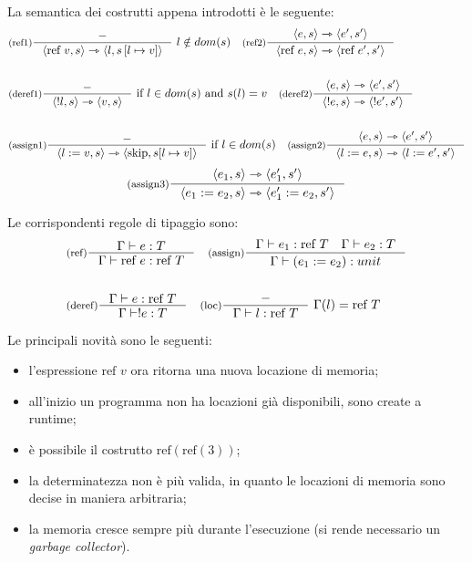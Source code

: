 \documentclass[a4paper, 11pt]{article}
\newcommand{\type}{\Gamma \vdash}
\newcommand{\goesto}{\rightarrowtriangle}
\begin{document}
La semantica dei costrutti appena introdotti è le seguente: \begin{align*}
	&\inference[(ref1)]{-}{\langle \text{ref } v,s \rangle \goesto \langle l, s\left[ l \mapsto v \right] \rangle}\ l \notin dom(s) \quad \inference[(ref2)]{\langle e,s \rangle \goesto \langle e',s' \rangle}{\langle \text{ref } e,s \rangle \goesto \langle \text{ref }e',s' \rangle} \\ \\
	&\inference[(deref1)]{-}{\langle !l, s \rangle \goesto \langle v,s \rangle}\ \text{if } l \in dom(s) \text{ and } s(l)=v \quad \inference[(deref2)]{\langle e,s \rangle \goesto \langle e',s' \rangle}{\langle !e,s \rangle \goesto \langle !e',s' \rangle} \\ \\
	&\inference[(assign1)]{-}{\langle l:= v,s \rangle \goesto \langle \text{skip}, s \lbrack l \mapsto v \rbrack \rangle}\ \text{if } l \in dom(s) \quad \inference[(assign2)]{\langle e,s \rangle \goesto \langle e',s' \rangle}{\langle l:=e,s \rangle \goesto \langle l:=e',s' \rangle}
\end{align*}
\[
	\inference[(assign3)]{\langle e_1,s \rangle \goesto \langle e_1',s' \rangle}{\langle e_1:=e_2,s \rangle \goesto \langle e_1':=e_2,s' \rangle}
\]

Le corrispondenti regole di tipaggio sono: \begin{align*}
	&\inference[(ref)]{\type e:T}{\type \text{ref } e: \text{ref }T} \quad \inference[(assign)]{\type e_1:\text{ref } T \quad \type e_2:T}{\type (e_1:=e_2):unit} \\ \\
	&\inference[(deref)]{\type e:\text{ref } T}{\type !e:T} \quad \inference[(loc)]{-}{\type l:\text{ref }T}\ \Gamma(l)=\text{ref }T
\end{align*}

Le principali novità sono le seguenti: \begin{itemize}
	\item l'espressione $\text{ref } v$ ora ritorna una nuova locazione di memoria;
	\item all'inizio un programma non ha locazioni già disponibili, sono create a runtime;
	\item è possibile il costrutto $\text{ref}(\text{ref}(3))$;
	\item la determinatezza non è più valida, in quanto le locazioni di memoria sono decise in maniera arbitraria;
	\item la memoria cresce sempre più durante l'esecuzione (si rende necessario un \textit{garbage collector}).
\end{itemize}
\end{document}
